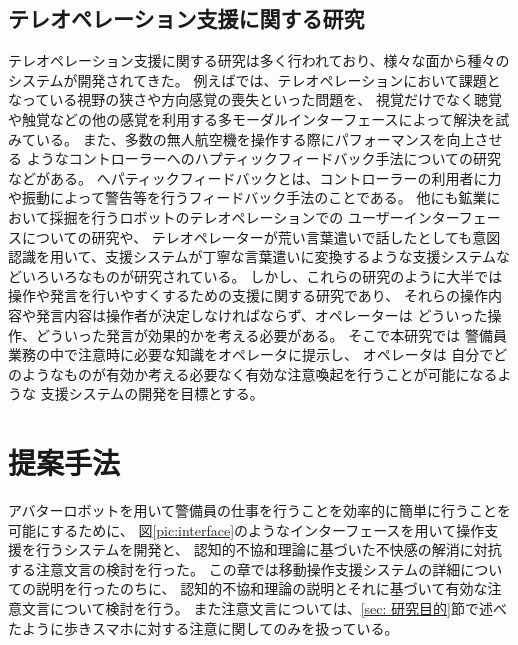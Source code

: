 \documentclass{kuisthesis}
\begin{document}
\subsection{テレオペレーション支援に関する研究}
テレオペレーション支援に関する研究は多く行われており、様々な面から種々のシステムが開発されてきた。
例えば\cite{chen2007human,triantafyllidis2020study}では、テレオペレーションにおいて課題となっている視野の狭さや方向感覚の喪失といった問題を、
視覚だけでなく聴覚や触覚などの他の感覚を利用する多モーダルインターフェースによって解決を試みている。
また、多数の無人航空機を操作する際にパフォーマンスを向上させる
ようなコントローラーへのハプティックフィードバック手法についての研究\cite{son2011measuring}などがある。
へパティックフィードバックとは、コントローラーの利用者に力や振動によって警告等を行うフィードバック手法のことである。
他にも鉱業において採掘を行うロボットのテレオペレーションでの
ユーザーインターフェースについての研究\cite{hainsworth2001teleoperation}や、
テレオペレーターが荒い言葉遣いで話したとしても意図認識を用いて、支援システムが丁寧な言葉遣いに変換するような支援システム\cite{Daneshmand2023}などいろいろなものが研究されている。
しかし、これらの研究のように大半では操作や発言を行いやすくするための支援に関する研究であり、
それらの操作内容や発言内容は操作者が決定しなければならず、オペレーターは
どういった操作、どういった発言が効果的かを考える必要がある。
そこで本研究では
警備員業務の中で注意時に必要な知識をオペレータに提示し、
オペレータは
自分でどのようなものが有効か考える必要なく有効な注意喚起を行うことが可能になるような
支援システムの開発を目標とする。


\section{提案手法}
アバターロボットを用いて警備員の仕事を行うことを効率的に簡単に行うことを可能にするために、
図\ref{pic:interface}のようなインターフェースを用いて操作支援を行うシステムを開発と、
認知的不協和理論\cite{Festinger1957}に基づいた不快感の解消に対抗する注意文言の検討を行った。
この章では移動操作支援システムの詳細についての説明を行ったのちに、
認知的不協和理論の説明とそれに基づいて有効な注意文言について検討を行う。
また注意文言については、\ref{sec: 研究目的}節で述べたように歩きスマホに対する注意に関してのみを扱っている。
\end{document}
